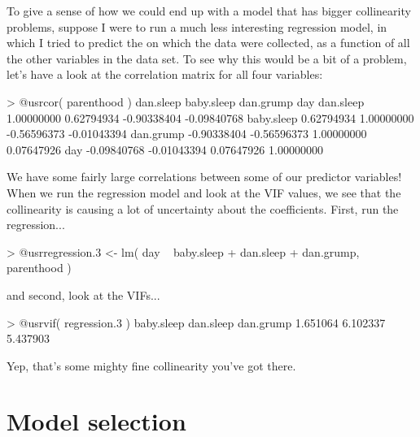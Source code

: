 To give a sense of how we could end up with a model that has bigger collinearity problems, suppose I were to run a much less interesting regression model, in which I tried to predict the  on which the data were collected, as a function of all the other variables in the data set. To see why this would be a bit of a problem, let's have a look at the correlation matrix for all four variables:
\begin{rblock1}
> @usr{cor( parenthood )}
             dan.sleep  baby.sleep   dan.grump         day
dan.sleep   1.00000000  0.62794934 -0.90338404 -0.09840768
baby.sleep  0.62794934  1.00000000 -0.56596373 -0.01043394
dan.grump  -0.90338404 -0.56596373  1.00000000  0.07647926
day        -0.09840768 -0.01043394  0.07647926  1.00000000
\end{rblock1}
We have some fairly large correlations between some of our predictor variables! When we run the regression model and look at the VIF values, we see that the collinearity is causing a lot of uncertainty about the coefficients. First, run the regression...
\begin{rblock1}
> @usr{regression.3 <- lm( day ~ baby.sleep + dan.sleep + dan.grump, parenthood )}
\end{rblock1}
and second, look at the VIFs...
\begin{rblock1}
> @usr{vif( regression.3 )}
baby.sleep  dan.sleep  dan.grump 
  1.651064   6.102337   5.437903 
\end{rblock1}
Yep, that's some mighty fine collinearity you've got there.




\section{Model selection\label{sec:modelselreg}}


